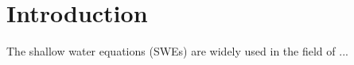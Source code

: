 \section{Introduction}
\label{sec:introduction}
The shallow water equations (SWEs) are widely used in the field of ...


